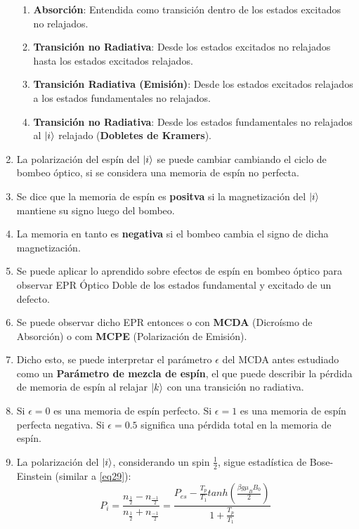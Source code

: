\documentclass[aps,rmp,reprint,longbibliography]{revtex4-1}
\begin{document}
\begin{enumerate}
\begin{enumerate}
    \item \textbf{Absorción}: Entendida como transición dentro de los estados excitados no relajados.
    \item \textbf{Transición no Radiativa}: Desde los estados excitados no relajados hasta los estados excitados relajados.
    \item \textbf{Transición Radiativa (Emisión)}: Desde los estados excitados relajados a los estados fundamentales no relajados.
    \item \textbf{Transición no Radiativa}: Desde los estados fundamentales no relajados al $\ket{i}$ relajado (\textbf{Dobletes de Kramers}).
\end{enumerate}
\item La polarización del espín del $\ket{i}$ se puede cambiar cambiando el ciclo de bombeo óptico, si se considera una memoria de espín no perfecta. 
\item Se dice que la memoria de espín es \textbf{positva} si la magnetización del $\ket{i}$ mantiene su signo luego del bombeo. 
\item La memoria en tanto es \textbf{negativa} si el bombeo cambia el signo de dicha magnetización.
\item Se puede aplicar lo aprendido sobre efectos de espín en bombeo óptico para observar EPR Óptico Doble de los estados fundamental y excitado de un defecto. 
\item Se puede observar dicho EPR entonces o con \textbf{MCDA} (Dicroísmo de Absorción) o com \textbf{MCPE} (Polarización de Emisión). 
\item Dicho esto, se puede interpretar el parámetro $\epsilon$ del MCDA antes estudiado como un \textbf{Parámetro de mezcla de espín}, el que puede describir la pérdida de memoria de espín al relajar $\ket{k}$ con una transición no radiativa. \item Si $\epsilon=0$ es una memoria de espín perfecto. Si $\epsilon=1$ es una memoria de espín perfecta negativa. Si $\epsilon=0.5$ significa una pérdida total en la memoria de espín.
\item La polarización del $\ket{i}$, considerando un spin $\frac{1}{2}$, sigue estadística de Bose-Einstein (similar a \ref{eq29}):
\begin{equation}\label{eq31} P_i=\frac{n_{\frac{1}{2}}-n_{\frac{-1}{2}}}{n_{\frac{1}{2}}+n_{\frac{-1}{2}}}=\frac{P_{es}-\frac{T_p}{T_1}tanh(\frac{\beta g \mu_B B_0}{2})}{1+\frac{T_p}{T_1}}\end{equation}

\end{enumerate}
\end{document}
